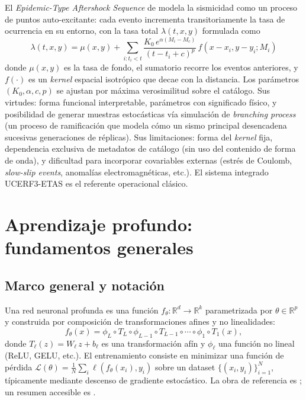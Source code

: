 El \emph{Epidemic-Type Aftershock Sequence} de \citet{ogata1988etas, ogata1998spacetime} modela la sismicidad como un proceso de puntos auto-excitante: cada evento incrementa transitoriamente la tasa de ocurrencia en su entorno, con la tasa total $\lambda(t, x, y)$ formulada como
\begin{equation}
  \lambda(t,x,y) = \mu(x,y) + \sum_{i: t_i < t} \frac{K_0\, e^{\alpha(M_i - M_c)}}{(t - t_i + c)^p}\, f(x - x_i, y - y_i; M_i)
  \label{eq:etas}
\end{equation}
donde $\mu(x,y)$ es la tasa de fondo, el sumatorio recorre los eventos anteriores, y $f(\cdot)$ es un \textit{kernel} espacial isotrópico que decae con la distancia. Los parámetros $(K_0, \alpha, c, p)$ se ajustan por máxima verosimilitud sobre el catálogo. Sus virtudes: forma funcional interpretable, parámetros con significado físico, y posibilidad de generar muestras estocásticas vía simulación de \textit{branching process} (un proceso de ramificación que modela cómo un sismo principal desencadena sucesivas generaciones de réplicas). Sus limitaciones: forma del \textit{kernel} fija, dependencia exclusiva de metadatos de catálogo (sin uso del contenido de forma de onda), y dificultad para incorporar covariables externas (estrés de Coulomb, \textit{slow-slip events}, anomalías electromagnéticas, etc.). El sistema integrado UCERF3-ETAS \citep{field2017ucerf3etas} es el referente operacional clásico.

\section{Aprendizaje profundo: fundamentos generales}
\label{dl-fundamentos}

\subsection{Marco general y notación}

Una red neuronal profunda es una función $f_\theta: \mathbb{R}^d \to \mathbb{R}^k$ parametrizada por $\theta \in \mathbb{R}^p$ y construida por composición de transformaciones afines y no linealidades:
\begin{equation}
  f_\theta(x) = \phi_L \circ T_L \circ \phi_{L-1} \circ T_{L-1} \circ \cdots \circ \phi_1 \circ T_1(x),
\end{equation}
donde $T_\ell(z) = W_\ell\, z + b_\ell$ es una transformación afín y $\phi_\ell$ una función no lineal (ReLU, GELU, etc.). El entrenamiento consiste en minimizar una función de pérdida $\mathcal{L}(\theta) = \tfrac{1}{N}\sum_i \ell(f_\theta(x_i), y_i)$ sobre un dataset $\{(x_i, y_i)\}_{i=1}^N$, típicamente mediante descenso de gradiente estocástico. La obra de referencia es \citet{goodfellow2016deep}; un resumen accesible es \citet{lecun2015deep}.

